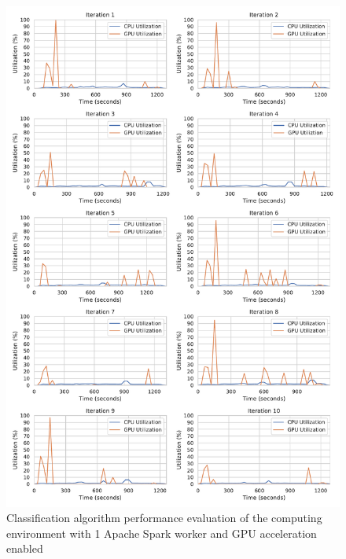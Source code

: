 \begin{figure}[h]
\centering
\includegraphics[scale=0.4]{images/07_evaluation/mortgage/mortgage_gpu1_performance}
\caption{Classification algorithm performance evaluation of the computing environment with 1 Apache Spark worker and GPU acceleration enabled}
\label{fig:07_mortgage_static-cpu_results}
\end{figure}

